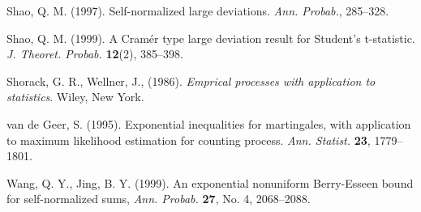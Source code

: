 \documentclass{gSTA2e}
\theoremstyle{plain}
\theoremstyle{definition}
\theoremstyle{remark}
\begin{document}
\begin{thebibliography}{99}
 Shao, Q. M. (1997). Self-normalized large deviations. \emph{Ann. Probab.}, 285--328.

 Shao, Q. M. (1999). A Cram\'{e}r type large deviation result for Student's t-statistic. \emph{J.  Theoret. Probab.}  \textbf{12}(2), 385--398.

 Shorack, G. R., Wellner, J., (1986). \emph{Emprical processes with application to statistics}. Wiley, New York.

 van de Geer, S. (1995). Exponential inequalities for martingales, with application to maximum likelihood estimation for counting
process. \emph{Ann. Statist.}  \textbf{23}, 1779--1801.



 Wang, Q. Y., Jing, B. Y.  (1999). An exponential nonuniform Berry-Esseen bound for self-normalized sums, \emph{Ann. Probab.} \textbf{27}, No. 4, 2068--2088.


\end{thebibliography}
\end{document}

